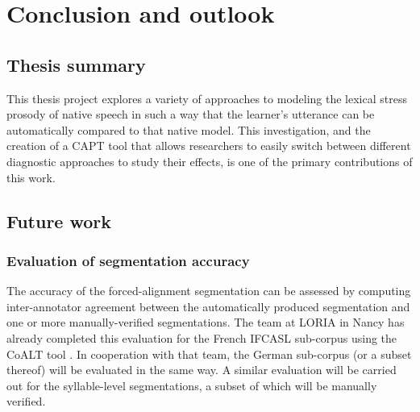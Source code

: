 %
%
\chapter{Conclusion and outlook}
\label{chap:conclusion}


\section{Thesis summary}
 \label{sec:conclusion:summary}
 
 
 This thesis project explores a variety of approaches to modeling the lexical stress prosody of native speech in such a way that the learner's utterance can be automatically compared to that native model. This investigation, and the creation of a CAPT tool that allows researchers to easily switch between different diagnostic approaches to study their effects, is one of the primary contributions of this work.

\section{Future work}
\label{sec:conclusion:future}


	\subsection{Evaluation of segmentation accuracy}
	
		\TODO{}

The accuracy of the forced-alignment segmentation can be assessed by computing inter-annotator agreement between the automatically produced segmentation and one or more manually-verified segmentations. The team at LORIA in Nancy has already completed this evaluation for the French IFCASL sub-corpus using the CoALT tool \citep{Fohr2012}. In cooperation with that team, the German sub-corpus (or a subset thereof) will be evaluated in the same way.
	A similar evaluation will be carried out for the syllable-level segmentations, a subset of which will be manually verified.

